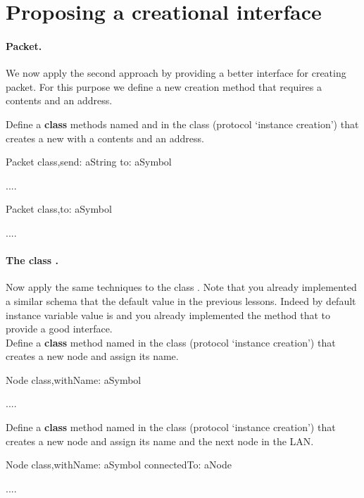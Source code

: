 \section{Proposing a creational interface}

\paragraph{Packet.}
We now apply the second approach by providing a better interface for creating packet. For this purpose we define a new creation method that requires a contents and an address.

Define a \textbf{class} methods named  and  in the class 
(protocol `instance creation') that creates a new  with a 
contents and an address. 

\begin{scode}
Packet class\sep{}send: aString to: aSymbol

....

Packet class\sep{}to: aSymbol

....
\end{scode}



\paragraph{The class .}

Now apply the same techniques to the class . Note that you already implemented a similar schema that the default value in the previous lessons. Indeed by default instance variable value is  and you already implemented the method  that to provide a good interface. \\
Define a \textbf{class} method named  in the class  (protocol 
`instance creation') that creates a new node and assign its name.

\begin{scode}
Node class\sep{}withName: aSymbol

....
\end{scode}

Define a \textbf{class} method named  in the class  
(protocol `instance creation') that creates a new node and assign its name and the next node in the LAN.

\begin{scode}
Node class\sep{}withName: aSymbol connectedTo: aNode

....
\end{scode}


